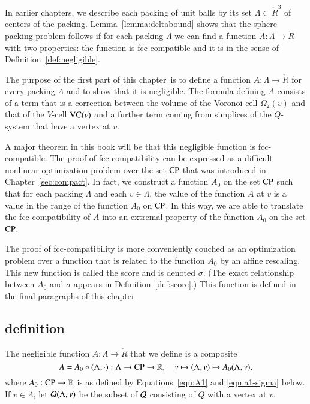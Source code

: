 \label{sec:scoring}

In earlier chapters, we describe each packing of unit balls by its set
$\Lambda\subset \ring{R}^3$ of centers of the packing.  
Lemma~\ref{lemma:deltabound} shows that the
sphere packing problem follows if for each %
packing $\Lambda$ we
can find a function $A:\Lambda\to\ring{R}$ with two properties: the
function is fcc-compatible and it is 
in the sense of
Definition~\ref{def:negligible}.

The purpose of the first part of this chapter\ is to define a
function $A:\Lambda\to\ring{R}$ for every 
packing
$\Lambda$ and to show that it is negligible.  The formula defining
$A$ consists of a term that is a correction between the volume of
the Voronoi cell $\Omega_2(v)$ and that of the $V$-cell ${\operatorname{VC}}(v)$
and a further term coming from simplices of the $Q$-system that
have a vertex at $v$.

A major theorem in this book will be that this negligible
function is fcc-compatible.  The proof of fcc-compatibility can be
expressed as a difficult nonlinear optimization problem over the
set ${\operatorname{CP}}$ that was introduced in Chapter~\ref{sec:compact}.  In
fact, we construct a  function $A_0$ on the set ${\operatorname{CP}}$ such
that for each %
packing $\Lambda$ and each $v\in\Lambda$,
the value of the function $A$ at $v$ is a value in the range of
the function $A_0$ on ${\operatorname{CP}}$. In this way, we are able to
translate the fcc-compatibility of $A$ into an extremal property
of the function $A_0$ on the set ${\operatorname{CP}}$.

The proof of fcc-compatibility is more conveniently couched as an
optimization problem over a function that is related to the
function $A_0$ by an affine rescaling.   This new function is
called the score and is denoted $\sigma$.  (The exact relationship
between $A_0$ and $\sigma$ appears in Definition~\ref{def:score}.)
This function is defined in the final paragraphs of this chapter.


\subsection{definition}
\label{sec:rules}


The
negligible function $A:\Lambda\to\ring{R}$ that we define is a
composite
  \begin{equation}
  A = A_0\circ (\Lambda,\cdot)
  :\Lambda\to {\operatorname{CP}}\to \mathbb{R},\quad v\mapsto (\Lambda,v)\mapsto
  A_0(\Lambda,v),
  \label{eqn:A}
  \end{equation}
where $A_0:{\operatorname{CP}}\to\mathbb{R}$ is as defined by
Equations~\ref{eqn:A1} and \ref{eqn:a1-sigma} below.  
If $v\in\Lambda$, let
${\mathcal Q}(\Lambda,v)$ be the subset of ${\mathcal Q}$ consisting of
$Q$ with a vertex at $v$.

